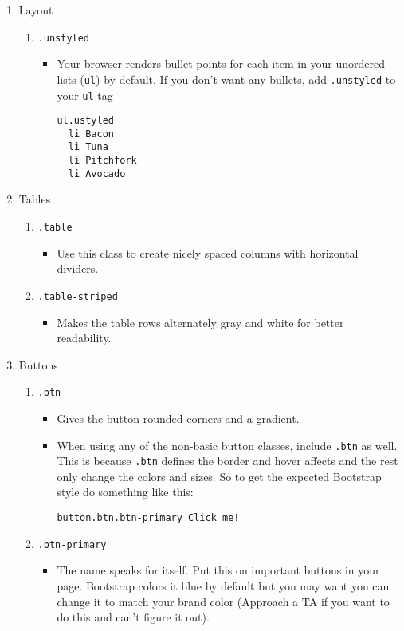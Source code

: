 \documentclass[10pt, twocolumn]{article}
\begin{document}
\begin{enumerate}
\item Layout
\begin{enumerate}
\item \texttt{.unstyled}
\begin{itemize}
\item Your browser renders bullet points for each item in your unordered lists (\texttt{ul}) by default.  If you don't want any bullets, add \texttt{.unstyled} to your \texttt{ul} tag
\begin{lstlisting}[frame=single]
ul.ustyled
  li Bacon 
  li Tuna
  li Pitchfork
  li Avocado
\end{lstlisting}
\end{itemize}
\end{enumerate}

\item Tables
\begin{enumerate}
\item \texttt{.table}
\begin{itemize}
\item Use this class to create nicely spaced columns with horizontal dividers.
\end{itemize}
\item \texttt{.table-striped}
\begin{itemize}
\item Makes the table rows alternately gray and white for better readability.
\end{itemize}
\end{enumerate}

\item Buttons
\begin{enumerate}
\item \texttt{.btn}
\begin{itemize}
\item Gives the button rounded corners and a gradient.
\item When using any of the non-basic button classes, include \texttt{.btn} as well.  This is because \texttt{.btn} defines the border and hover affects and the rest only change the colors and sizes.  So to get the expected Bootstrap style do something like this:
\begin{lstlisting}[frame=single]
button.btn.btn-primary Click me!
\end{lstlisting}
\end{itemize}

\item \texttt{.btn-primary}
\begin{itemize}
\item The name speaks for itself.  Put this on important buttons in your page.  Bootstrap colors it blue by default but you may want you can change it to match your brand color (Approach a TA if you want to do this and can't figure it out).
\end{itemize}


\end{enumerate}
\end{enumerate}
\end{document}
